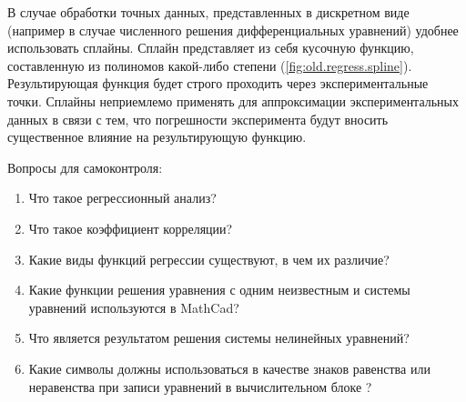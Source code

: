 В случае обработки точных данных, представленных в дискретном виде (например в случае численного решения дифференциальных уравнений) удобнее использовать сплайны. Сплайн представляет из себя кусочную функцию, составленную из полиномов какой-либо степени (\ref{fig:old.regress.spline}). Результирующая функция будет строго проходить через экспериментальные точки. Сплайны неприемлемо применять для аппроксимации экспериментальных данных в связи с тем, что погрешности эксперимента будут вносить существенное влияние на результирующую функцию.



Вопросы для самоконтроля:
\begin{enumerate}
\item Что такое регрессионный анализ?
\item Что такое коэффициент корреляции?
\item Какие виды функций регрессии существуют, в чем их различие?
\item Какие функции решения уравнения с одним неизвестным и системы уравнений используются в MathCad?
\item Что является результатом решения системы нелинейных уравнений?
\item Какие символы должны использоваться в качестве знаков равенства или неравенства при записи уравнений в вычислительном блоке ?
\end{enumerate}